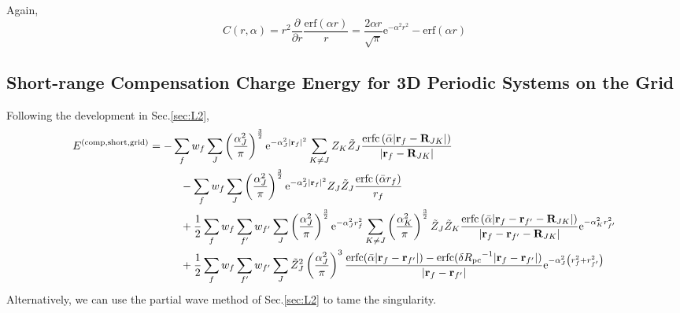 \documentclass[paper=a4, fontsize=11pt]{article} %
\numberwithin{equation}{section} %
\numberwithin{figure}{section} %
\numberwithin{table}{section} %
\newcommand{\p}{\partial}
\newcommand{\br}{{\bf{r}}}
\newcommand{\bR}{{\bf{R}}}
\newcommand{\re}{{\mathrm{e}}}
\newcommand{\rshort}{{\mathrm{short}}}
\newcommand{\rerf}{{\mathrm{erf}}}
\newcommand{\rerfc}{{\mathrm{erfc}}}
\newcommand{\rcomp}{{\mathrm{comp}}}
\newcommand{\al}{{\alpha}}
\newcommand{\Rpc}{{R_{\mathrm{pc}}}}
\newcommand{\bal}{{\bar{\alpha}}}
\begin{document}
Again,
\begin{equation}
C(r,\al) = r^2 \frac{\p}{\p r}\frac{\rerf(\al r)}{r} =\frac{2\al r}{\sqrt{\pi}}\re^{-\al^2 r^2} - \rerf(\al r)
\end{equation}




\subsection{Short-range Compensation Charge Energy for 3D Periodic Systems on the Grid}
Following the development in Sec.\ref{sec:L2},
\begin{equation}
\begin{split}
E^{(\rcomp,\rshort,\mathrm{grid})}
&= -\sum_f w_f \sum_J  \left(\frac{\al_J^2}{\pi}\right)^{\frac{3}{2}}\re^{-\al_J^2|\br_f|^2} \sum_{K \neq J} Z_K \tilde Z_J\frac{\rerfc\left(\bal|\br_f - \bR_{JK}|\right)}{|\br_f - \bR_{JK}|}\\
&\hspace{10mm} -\sum_f w_f \sum_J  \left(\frac{\al_J^2}{\pi}\right)^{\frac{3}{2}}\re^{-\al_J^2|\br_f|^2} Z_J \tilde Z_J\frac{\rerfc\left(\bal r_f\right)}{r_f}\\ 
&\hspace{10mm}+ \frac{1}{2}\sum_f w_f \sum_{f'} w_{f'} \sum_J \left(\frac{\al_J^2}{\pi}\right)^{\frac{3}{2}} \re^{-\al_J^2 r_f^2} \sum_{K \neq J} \left(\frac{\al_K^2}{\pi}\right)^{\frac{3}{2}} \tilde Z_J\tilde Z_K\frac{\rerfc\left(\bal|\br_f-\br_{f'}-\bR_{JK}|\right)}{|\br_f-\br_{f'}-\bR_{JK}|} \re^{-\al_K^2 r_{f'}^2} \\
&\hspace{10mm}+ \frac{1}{2}\sum_f w_f \sum_{f'} w_{f'} \sum_J \tilde Z_J^2 \left(\frac{\al_J^2}{\pi}\right)^3 \frac{\rerfc(\bal|\br_f - \br_{f'}|)-\rerfc(\delta\Rpc^{-1}|\br_f - \br_{f'}|)}{|\br_f-\br_{f'}|}\re^{-\al_J^2 \left(r_f^2+r_{f'}^2\right)}\\
\end{split}
\end{equation}
Alternatively, we can use the partial wave method of Sec.\ref{sec:L2} to tame the singularity.
\end{document}
